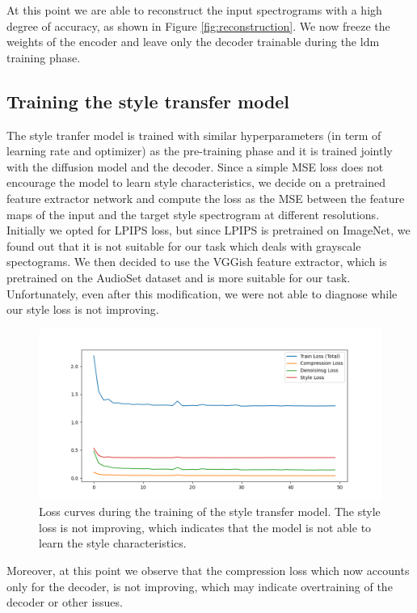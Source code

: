 \noindent At this point we are able to reconstruct the input spectrograms with a high degree of accuracy, as shown in Figure \ref{fig:reconstruction}. We now freeze the weights of the encoder and leave only the decoder trainable during the ldm training phase.

\subsection{Training the style transfer model}

The style tranfer model is trained with similar hyperparameters (in term of learning rate and optimizer) as the pre-training phase and it is trained jointly with the diffusion model and the decoder. Since a simple MSE loss does not encourage the model to learn style characteristics, we decide on a pretrained feature extractor network and compute the loss as the MSE between the feature maps of the input and the target style spectrogram at different resolutions. Initially we opted for LPIPS loss, but since LPIPS is pretrained on ImageNet, we found out that it is not suitable for our task which deals with grayscale spectograms. We then decided to use the VGGish feature extractor, which is pretrained on the AudioSet dataset and is more suitable for our task. Unfortunately, even after this modification, we were not able to diagnose while our style loss is not improving.

\begin{figure}[h]
    \centering
    \includegraphics[width=\textwidth]{figures/ldm_loss.png}
    \caption{Loss curves during the training of the style transfer model. The style loss is not improving, which indicates that the model is not able to learn the style characteristics.}
    \label{fig:style_transfer}
\end{figure}

\noindent Moreover, at this point we observe that the compression loss which now accounts only for the decoder, is not improving, which may indicate overtraining of the decoder or other issues.

